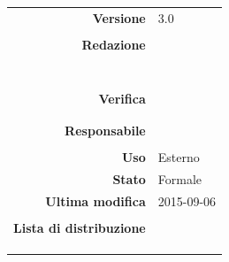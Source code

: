 \begin{titlepage}
\begin{center}
	\begin{table}[h]
	\begin{center}
	\begin{tabular}{r | l}
		\textbf{Versione} & 3.0 \\ \\
		\textbf{Redazione} & \VeFe \\ 
			& \CoMa \\ 
			& \CaMa \\
			& \MaMo \\
			& \ReAn \\
			& \GoIs \\
			& \DeEn \\ \\
		\textbf{Verifica} & \MaMo \\
			& \ReAn \\ \\
		\textbf{Responsabile} & \CaMa \\ \\
		\textbf{Uso} & Esterno \\
		\textbf{Stato} & Formale \\
		\textbf{Ultima modifica} & 2015-09-06 \\ \\
		\textbf{Lista di distribuzione} & \gruppo \\ 
			& \Vardanega \\
			& \Cardin \\
			& \Zucchetti \\
	\end{tabular}
	\end{center}
	\end{table}
	\end{center}
\end{titlepage}